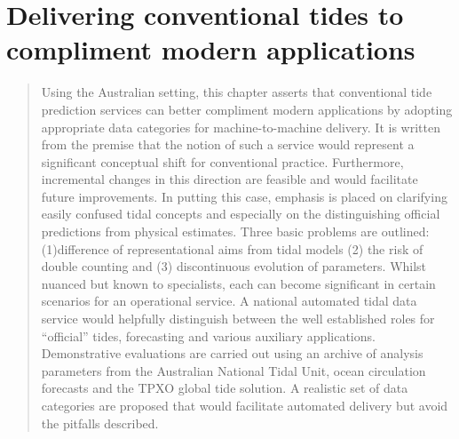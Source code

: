 \chapter{Delivering conventional tides to compliment modern applications}
\begin{quote}
{\small
Using the Australian setting, this chapter asserts that conventional tide prediction services can better compliment modern applications by adopting appropriate data categories for machine-to-machine delivery.  It is written from the premise that the notion of such a service would represent a significant conceptual shift for conventional practice. Furthermore, incremental changes in this direction are feasible and would facilitate future improvements. In putting this case, emphasis is placed on clarifying easily confused tidal concepts and especially on the distinguishing official predictions from physical estimates. Three basic problems are outlined: (1)difference of representational aims from tidal models (2) the risk of double counting and (3) discontinuous evolution of parameters.  Whilst nuanced but known to specialists, each can become significant in certain scenarios for an operational service.  A national automated tidal data service would helpfully distinguish between the well established roles for ``official'' tides, forecasting and various auxiliary applications. Demonstrative evaluations are carried out using an archive of analysis parameters from the Australian National Tidal Unit, ocean circulation forecasts and the TPXO global tide solution. A realistic set of data categories are proposed that would facilitate automated delivery but avoid the pitfalls described.
}
\end{quote}

\label{chp:tideFlavours}
\newcommand{\Ba}{63540}
\newcommand{\Ca}{46290}
\newcommand{\Da}{62430}
\newcommand{\Ea}{62290}
\newcommand{\Fa}{61561}
\newcommand{\Ga}{57720}

\newcommand{\Bb}{529020}
\newcommand{\Cb}{200970}
\newcommand{\Db}{005096}
\newcommand{\Eb}{008314}
\newcommand{\Fb}{523757}
\newcommand{\Gb}{200854}

\newcommand{\Bname}{Mornington Island}
\newcommand{\Cname}{Christmas Island}
\newcommand{\Dname}{Point Murat}
\newcommand{\Ename}{Geraldton}
\newcommand{\Fname}{Cape Jervis}
\newcommand{\Gname}{Lord Howe Island}

